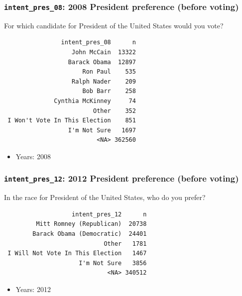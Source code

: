 \documentclass[10pt,article,oneside]{memoir}
\theoremstyle{definition}
\begin{document}
\hypertarget{intent_pres_08-2008-president-preference-before-voting}{%
\subsubsection{\texorpdfstring{\texttt{intent\_pres\_08}: 2008 President
preference (before
voting)}{intent\_pres\_08: 2008 President preference (before voting)}}\label{intent_pres_08-2008-president-preference-before-voting}}

For which candidate for President of the United States would you vote?

\begin{verbatim}
                intent_pres_08      n
                   John McCain  13322
                  Barack Obama  12897
                      Ron Paul    535
                   Ralph Nader    209
                      Bob Barr    258
              Cynthia McKinney     74
                         Other    352
 I Won't Vote In This Election    851
                  I'm Not Sure   1697
                          <NA> 362560
\end{verbatim}

\begin{itemize}
\tightlist
\item
  Years: 2008
\end{itemize}

\hypertarget{intent_pres_12-2012-president-preference-before-voting}{%
\subsubsection{\texorpdfstring{\texttt{intent\_pres\_12}: 2012 President
preference (before
voting)}{intent\_pres\_12: 2012 President preference (before voting)}}\label{intent_pres_12-2012-president-preference-before-voting}}

In the race for President of the United States, who do you prefer?

\begin{verbatim}
                   intent_pres_12      n
         Mitt Romney (Republican)  20738
        Barack Obama (Democratic)  24401
                            Other   1781
 I Will Not Vote In This Election   1467
                     I'm Not Sure   3856
                             <NA> 340512
\end{verbatim}

\begin{itemize}
\tightlist
\item
  Years: 2012
\end{itemize}
\end{document}
